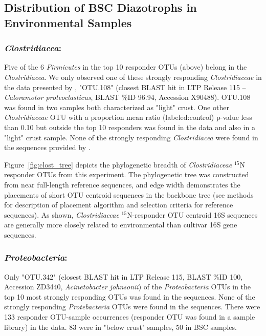 \subsection{Distribution of BSC Diazotrophs in Environmental Samples}
\subsubsection{\textbf{\textit{Clostridiacea}:}} Five of the 6
\textit{Firmicutes} in the top 10 responder OTUs (above) belong in the
\textit{Clostridiacea}. We only observed one of these strongly responding
\textit{Clostridiaceae} in the data presented by \citet{Garcia_Pichel_2013},
"OTU.108" (closest BLAST hit in LTP Release 115 -- \textit{Caloramotor
proteoclasticus}, BLAST \%ID 96.94, Accession X90488).  OTU.108 was found in
two samples both characterized as "light" crust. One other
\textit{Clostridiaceae} OTU with a proportion mean ratio (labeled:control)
p-value less than 0.10 but outside the top 10 responders was found in the
\citet{Garcia_Pichel_2013} data and also in a "light" crust sample. None of
the strongly responding \textit{Clostridiacea} were found in the sequences
provided by \citet{Steven_2013}.

Figure~\ref{fig:clost_tree} depicts the phylogenetic breadth of
\textit{Clostridiaceae} $^{15}$N responder OTUs from this experiment. The
phylogenetic tree was constructed from near full-length reference sequences,
and edge width demonstrates the placements of short OTU centroid sequences in
the backbone tree (see methods for description of placement algorithm and
selection criteria for reference sequences). As shown,
\textit{Clostridiaceae} $^{15}$N-responder OTU centroid 16S sequences are
generally more closely related to environmental than cultivar 16S gene
sequences.   

\subsubsection{\textbf{\textit{Proteobacteria}:}} Only "OTU.342" (closest
BLAST hit in LTP Release 115, BLAST \%ID 100, Accession ZD3440,
\textit{Acinetobacter johnsonii}) of the \textit{Proteobacteria} OTUs in the
top 10 most strongly responding OTUs was found in the
\citet{Garcia_Pichel_2013} sequences. None of the strongly responding
\textit{Protebacteria} OTUs were found in the \citet{Steven_2013} sequences.
There were 133 responder OTU-sample occurrences (responder OTU was found in a
sample library) in the \citet{Steven_2013} data.  83 were in "below crust"
samples, 50 in BSC samples.

